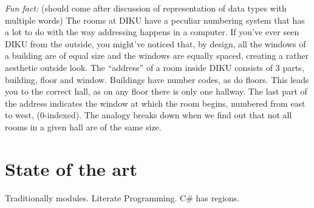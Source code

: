 \emph{Fun fact:} (should come after discussion of representation of data types
with multiple words) The rooms at DIKU have a peculiar numbering system that
has a lot to do with the way addressing happens in a computer. If you've ever
seen DIKU from the outside, you might've noticed that, by design, all the
windows of a building are of equal size and the windows are equally spaced,
creating a rather aesthetic outside look. The ``address'' of a room inside DIKU
consists of 3 parts, building, floor and window. Buildings have number codes,
as do floors. This leads you to the correct hall, as on any floor there is only
one hallway. The last part of the address indicates the window at which the
room begins, numbered from east to west, (0-indexed). The analogy breaks down
when we find out that not all rooms in a given hall are of the same size.



\section{State of the art}

Traditionally modules. Literate Programming. C\# has regions.


